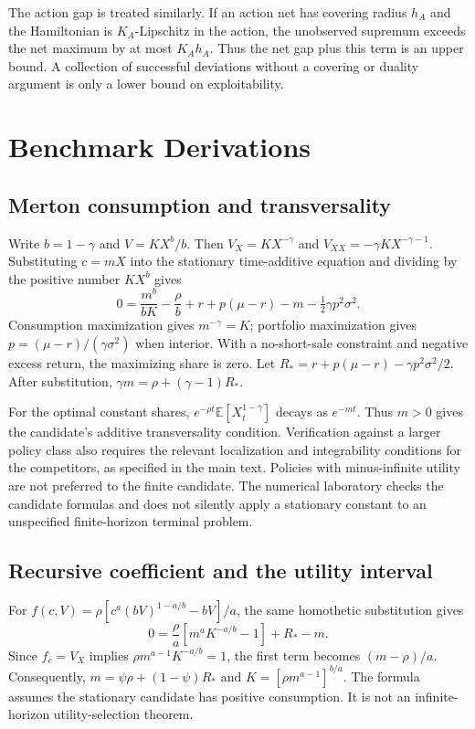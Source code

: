 \documentclass[ecta,draft]{econsocart}
\newcommand{\E}{\mathbb E}
\begin{document}
The action gap is treated similarly. If an action net has covering radius $h_A$ and the Hamiltonian is $K_A$-Lipschitz in the action, the unobserved supremum exceeds the net maximum by at most $K_Ah_A$. Thus the net gap plus this term is an upper bound. A collection of successful deviations without a covering or duality argument is only a lower bound on exploitability.

\section{Benchmark Derivations}
\subsection{Merton consumption and transversality}
Write $b=1-\gamma$ and $V=KX^b/b$. Then $V_X=KX^{-\gamma}$ and $V_{XX}=-\gamma KX^{-\gamma-1}$. Substituting $c=mX$ into the stationary time-additive equation and dividing by the positive number $KX^b$ gives
\[
 0=\frac{m^b}{bK}-\frac\rho b+r+p(\mu-r)-m-\tfrac12\gamma p^2\sigma^2.
\]
Consumption maximization gives $m^{-\gamma}=K$; portfolio maximization gives $p=(\mu-r)/(\gamma\sigma^2)$ when interior. With a no-short-sale constraint and negative excess return, the maximizing share is zero. Let $R_*=r+p(\mu-r)-\gamma p^2\sigma^2/2$. After substitution, $\gamma m=\rho+(\gamma-1)R_*$.

For the optimal constant shares, $e^{-\rho t}\E[X_t^{1-\gamma}]$ decays as $e^{-m t}$. Thus $m>0$ gives the candidate's additive transversality condition. Verification against a larger policy class also requires the relevant localization and integrability conditions for the competitors, as specified in the main text. Policies with minus-infinite utility are not preferred to the finite candidate. The numerical laboratory checks the candidate formulas and does not silently apply a stationary constant to an unspecified finite-horizon terminal problem.

\subsection{Recursive coefficient and the utility interval}
For $f(c,V)=\rho[c^a(bV)^{1-a/b}-bV]/a$, the same homothetic substitution gives
\[
 0=\frac\rho a[m^aK^{-a/b}-1]+R_*-m.
\]
Since $f_c=V_X$ implies $\rho m^{a-1}K^{-a/b}=1$, the first term becomes $(m-\rho)/a$. Consequently, $m=\psi\rho+(1-\psi)R_*$ and $K=[\rho m^{a-1}]^{b/a}$. The formula assumes the stationary candidate has positive consumption. It is not an infinite-horizon utility-selection theorem.
\end{document}
